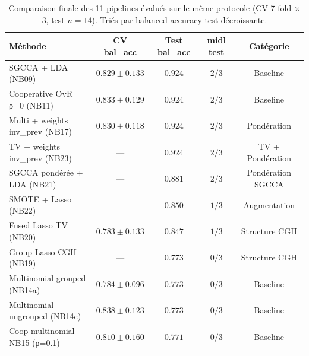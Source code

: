 \begin{table}[h]
\centering
\renewcommand{\arraystretch}{1.15}
\begin{tabular}{l|c c c c}
\hline
\textbf{Méthode} & \textbf{CV bal\_acc} & \textbf{Test bal\_acc} & \textbf{midl test} & \textbf{Catégorie} \\
\hline
SGCCA + LDA (NB09) & $0.829 \pm 0.133$ & $0.924$ & $2/3$ & Baseline \\
Cooperative OvR ρ=0 (NB11) & $0.833 \pm 0.129$ & $0.924$ & $2/3$ & Baseline \\
Multi + weights inv_prev (NB17) & $0.830 \pm 0.118$ & $0.924$ & $2/3$ & Pondération \\
TV + weights inv_prev (NB23) & — & $0.924$ & $2/3$ & TV + Pondération \\
SGCCA pondérée + LDA (NB21) & — & $0.881$ & $2/3$ & Pondération SGCCA \\
SMOTE + Lasso (NB22) & — & $0.850$ & $1/3$ & Augmentation \\
Fused Lasso TV (NB20) & $0.783 \pm 0.133$ & $0.847$ & $1/3$ & Structure CGH \\
Group Lasso CGH (NB19) & — & $0.773$ & $0/3$ & Structure CGH \\
Multinomial grouped (NB14a) & $0.784 \pm 0.096$ & $0.773$ & $0/3$ & Baseline \\
Multinomial ungrouped (NB14c) & $0.838 \pm 0.123$ & $0.773$ & $0/3$ & Baseline \\
Coop multinomial NB15 (ρ=0.1) & $0.810 \pm 0.160$ & $0.771$ & $0/3$ & Baseline \\
\hline
\end{tabular}
\caption{Comparaison finale des 11 pipelines évalués sur le même protocole (CV 7-fold $\times$ 3, test $n=14$). Triés par balanced accuracy test décroissante.}
\label{tab:final_comparison}
\end{table}